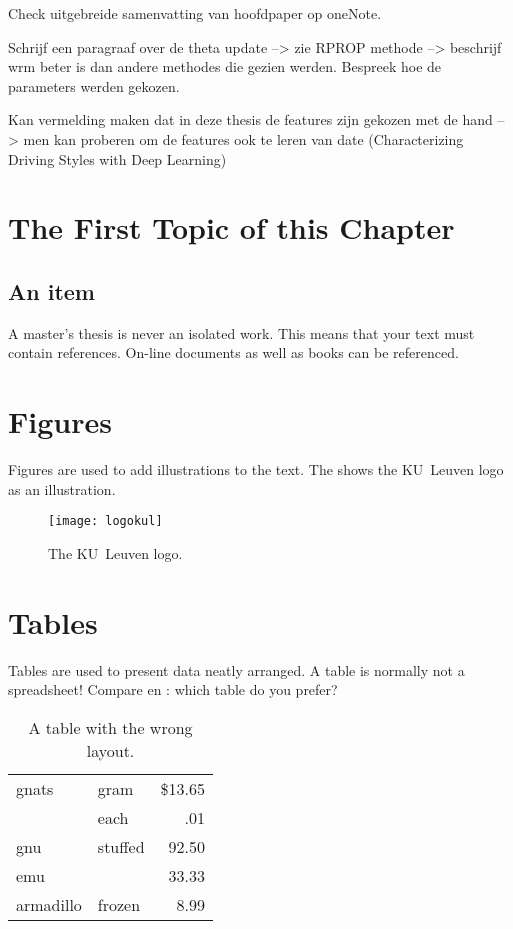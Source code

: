 Check uitgebreide samenvatting van hoofdpaper op oneNote.

Schrijf een paragraaf over de theta update --> zie RPROP methode --> beschrijf wrm beter is dan andere methodes die gezien werden. Bespreek hoe de parameters werden gekozen. 


Kan vermelding maken dat in deze thesis de features zijn gekozen met de hand --> men kan proberen om de features ook te leren van date (Characterizing Driving Styles with Deep Learning)

\clearpage




\section{The First Topic of this Chapter}


\subsection{An item}
A master's thesis is never an isolated work. This means that your text must
contain references. On-line documents\cite{wiki} as well as
books\cite{pratchett06:_good_omens} can be referenced.

\section{Figures}
Figures are used to add illustrations to the text. The  shows
the KU~Leuven logo as an illustration.
\begin{figure}
  \centering
  \texttt{[image: logokul]}
  \caption{The KU~Leuven logo.}
  \label{fig:logo}
\end{figure}

\section{Tables}
Tables are used to present data neatly arranged. A table is normally
not a spreadsheet! Compare  en : which table do
you prefer?

\begin{table}
  \centering
  \begin{tabular}{||l|lr||} \hline
    gnats     & gram      & \$13.65 \\ \cline{2-3}
              & each      & .01 \\ \hline
    gnu       & stuffed   & 92.50 \\ \cline{1-1} \cline{3-3}
    emu       &           & 33.33 \\ \hline
    armadillo & frozen    & 8.99 \\ \hline
  \end{tabular}
  \caption{A table with the wrong layout.}
  \label{tab:wrong}
\end{table}

